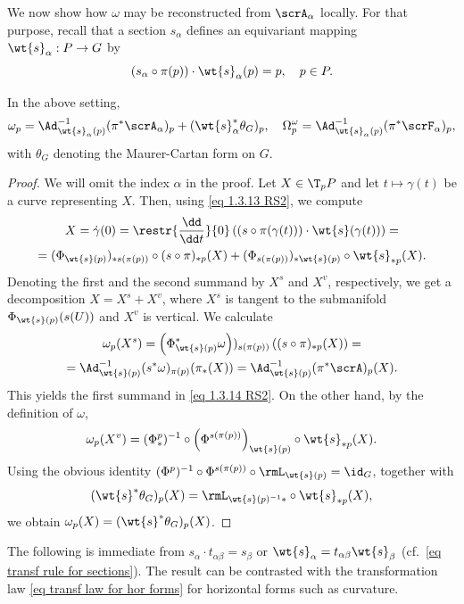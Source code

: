 We now show how $\omega$ may be reconstructed from $\scrA_\alpha$ locally. For that purpose, recall that a section $s_\alpha$ defines an equivariant mapping $\wt{s}_\alpha:P\to G$ by
\[(s_\alpha\circ\pi(p))\cdot \wt{s}_\alpha(p)=p,\quad p\in P.\label{eq 1.3.13 RS2}\]

\begin{prop}[{{\cite[Prop.~1.3.11]{RS2}}}]
    In the above setting, 
    \[\omega_p=\Ad_{\wt{s}_\alpha(p)}^{-1}(\pi^\ast\scrA_\alpha)_p+(\wt{s}_\alpha^\ast \theta_G)_p,\quad \Omega^\omega_p=\Ad_{\wt{s}_\alpha(p)}^{-1}(\pi^\ast \scrF_\alpha)_p, \label{eq 1.3.14 RS2}\]
    with $\theta_G$ denoting the Maurer-Cartan form on $G$.
\end{prop}
\begin{proof}
    We will omit the index $\alpha$ in the proof. Let $X\in \T_pP$ and let $t\mapsto \gamma(t)$ be a curve representing $X$. Then, using \eqref{eq 1.3.13 RS2}, we compute
    \begin{multline}
        X=\dot\gamma(0)=\restr{\frac{\dd}{\dd t}}{0} \left((s\circ \pi(\gamma(t)))\cdot \wt{s}(\gamma(t))\right)=\\
        =(\Phi_{\wt{s}(p)})_{\ast s(\pi(p))}\circ (s\circ \pi)_{\ast p}(X)+(\Phi_{s(\pi(p))})_{\ast\wt{s}(p)}\circ \wt{s}_{\ast p}(X).
    \end{multline}
    Denoting the first and the second summand by $X^s$ and $X^v$, respectively, we get a decomposition $X=X^s+X^v$, where $X^s$ is tangent to the submanifold $\Phi_{\wt{s}(p)}(s(U))$ and $X^v$ is vertical. We calculate
    \begin{multline}
        \omega_p(X^s)=\left(\Phi_{\wt{s}(p)}^\ast\omega\right))_{s(\pi(p))}\left((s\circ\pi)_{\ast p}(X)\right)=\\
        =\Ad_{\wt{s}(p)}^{-1}(s^\ast \omega)_{\pi(p)}(\pi_\ast(X))=\Ad_{\wt{s}(p)}^{-1}(\pi^\ast\scrA)_p(X).
    \end{multline}
    This yields the first summand in \eqref{eq 1.3.14 RS2}. On the other hand, by the definition of $\omega$, 
    \[\omega_p(X^v)=(\Phi^p_{\ast})^{-1}\circ \left(\Phi^{s(\pi(p))}\right)_{\wt{s}(p)}\circ \wt{s}_{\ast p}(X).\]
    Using the obvious identity $(\Phi^p)^{-1}\circ \Phi^{s(\pi(p))}\circ \rmL_{\wt{s}(p)}=\id_G$, together with
    \[(\wt{s}^\ast \theta_G)_p(X)=\rmL_{\wt{s}(p)^{-1}\ast }\circ\wt{s}_{\ast p}(X),\]
    we obtain $\omega_p(X)=(\wt{s}^\ast\theta_G)_p(X)$.
\end{proof}
The following is immediate from $s_\alpha\cdot t_{\alpha\beta}=s_\beta$  or $\wt{s}_\alpha=t_{\alpha\beta}\wt{s}_\beta$ (cf.\ \eqref{eq transf rule for sections}). The result can be contrasted with the transformation law \eqref{eq transf law for hor forms} for horizontal forms such as curvature.
